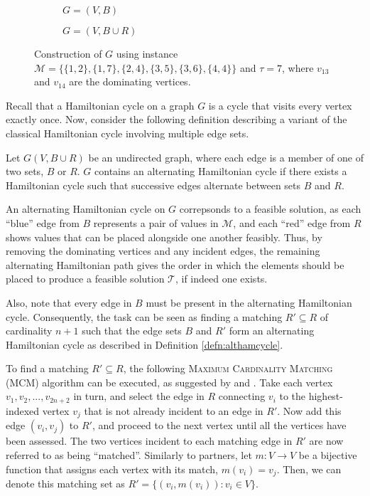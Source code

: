 \documentclass[oribibl]{llncs}
\begin{document}
\begin{figure}	
\centering
\begin{subfigure}[h]{0.45\textwidth}
	
	\caption{$G = (V, B)$}	
	\label{fig:partners}
\end{subfigure} \hspace{40pt}
\begin{subfigure}[h]{0.45\textwidth}
	
	\caption{$G=(V, B \cup R)$}	
	\label{fig:threshold}
\end{subfigure}
\caption{Construction of $G$ using instance $\mathcal{M} = \{\{1,2\}, \{1,7\}, \{2,4\}, \{3,5\}, \{3,6\}, \{4,4\}\}$ and $\tau = 7$, where $v_{13}$ and $v_{14}$ are the dominating vertices.}
\label{fig:partners/threshold}
\end{figure}

Recall that a Hamiltonian cycle on a graph $G$ is a cycle that visits every vertex exactly once. Now, consider the following definition describing a variant of the classical Hamiltonian cycle involving multiple edge sets.
\begin{definition}
	\label{defn:althamcycle}
	Let $G(V, B\cup R)$ be an undirected graph, where each edge is a member of one of two sets, $B$ or $R$. $G$ contains an alternating Hamiltonian cycle if there exists a Hamiltonian cycle such that successive edges alternate between sets $B$ and $R$.
\end{definition}

An alternating Hamiltonian cycle on $G$ correpsonds to a feasible solution, as each ``blue'' edge from $B$ represents a pair of values in $\mathcal{M}$, and each ``red'' edge from $R$ shows values that can be placed alongside one another feasibly. Thus, by removing the dominating vertices and any incident edges, the remaining alternating Hamiltonian path gives the order in which the elements should be placed to produce a feasible solution $\mathcal{T}$, if indeed one exists.

Also, note that every edge in $B$ must be present in the alternating Hamiltonian cycle. Consequently, the task can be seen as finding a matching $R' \subseteq R$ of cardinality $n+1$ such that the edge sets $B$ and $R'$ form an alternating Hamiltonian cycle as described in Definition \ref{defn:althamcycle}. 

To find a matching $R' \subseteq R$, the following \textsc{Maximum Cardinality Matching} (MCM) algorithm can be executed, as suggested by \cite{mahadev1994} and \cite{becker2010}. Take each vertex $v_1, v_2,..., v_{2n+2}$ in turn, and select the edge in $R$ connecting $v_i$ to the highest-indexed vertex $v_j$ that is not already incident to an edge in $R'$. Now add this edge $(v_i, v_j)$ to $R'$, and proceed to the next vertex until all the vertices have been assessed. The two vertices incident to each matching edge in $R'$ are now referred to as being ``matched''. Similarly to partners, let $m : V \to V$ be a bijective function that assigns each vertex with its match, $m(v_i) = v_j$. Then, we can denote this matching set as $R' =\{(v_i, m(v_i)) : v_i \in V\}$. 
\end{document}
